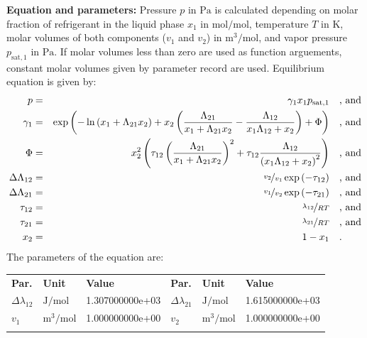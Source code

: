 \textbf{Equation and parameters:}
\newline
%
Pressure $p$ in $\si{\pascal}$ is calculated depending on molar fraction of refrigerant in the liquid phase $x_1$ in $\si{\mole\per\mole}$, temperature $T$ in $\si{\kelvin}$, molar volumes of both components ($v_1$ and $v_2$) in $\si{\cubic\meter\per\mole}$, and vapor pressure $p_\mathrm{sat,1}$ in $\si{\pascal}$. If molar volumes less than zero are used as function arguements, constant molar volumes given by parameter record are used. Equilibrium equation is given by:
%
\begin{equation*}
\begin{split}
p &=& \gamma_1 x_1 p_\mathrm{sat,1} & \quad\text{, and} \\
\gamma_1 &=& \exp \left( - \ln \left( x_1 + \Lambda_{21} x_2 \right) + x_2 \left( \frac{\Lambda_{21}}{x_1 + \Lambda_{21} x_2} - \frac{\Lambda_{12}}{x_1 \Lambda_{12} + x_2} \right) + \Phi \right) & \quad\text{, and} \\
\Phi &=& x_2^2 \left( \tau_{12} \left( \frac{\Lambda_{21}}{x_1 + \Lambda_{21} x_2} \right) ^2 + \tau_{12} \frac{\Lambda_{12}}{\left( x_1 \Lambda_{12} + x_2 \right) ^2}  \right) & \quad\text{, and} \\
\Delta\Lambda_{12} &=& \nicefrac{v_2}{v_1} \exp \left( - \tau_{12} \right) & \quad\text{, and} \\
\Delta\Lambda_{21} &=& \nicefrac{v_1}{v_2} \exp \left( - \tau_{21} \right) & \quad\text{, and} \\
\tau_{12} &=& \nicefrac{\lambda_{12}}{R T} & \quad\text{, and} \\
\tau_{21} &=& \nicefrac{\lambda_{21}}{R T} & \quad\text{, and} \\
x_2 &=& 1 - x_1  & \quad\text{.} \\
\end{split}
\end{equation*}
%
The parameters of the equation are:
%
\begin{longtable}[l]{lll|lll}
\toprule
\addlinespace
\textbf{Par.} & \textbf{Unit} & \textbf{Value} &	\textbf{Par.} & \textbf{Unit} & \textbf{Value} \\
\addlinespace
\midrule
\endhead

\bottomrule
\endfoot
\bottomrule
\endlastfoot
\addlinespace

$\Delta\lambda_{12}$ & $\si{\joule\per\mole}$ & 1.307000000e+03 & $\Delta\lambda_{21}$ & $\si{\joule\per\mole}$ & 1.615000000e+03 \\
$v_1$ & $\si{\cubic\meter\per\mole}$ & 1.000000000e+00 & $v_2$ & $\si{\cubic\meter\per\mole}$ & 1.000000000e+00 \\

\addlinespace\end{longtable}

